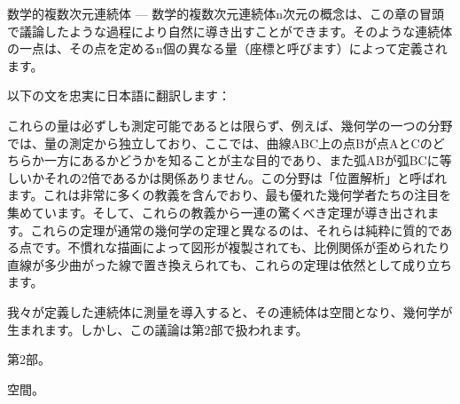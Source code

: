 \documentclass[a4paper,11pt,openany]{ltjsbook}
\begin{document}
数学的複数次元連続体 — 数学的複数次元連続体n次元の概念は、この章の冒頭で議論したような過程により自然に導き出すことができます。そのような連続体の一点は、その点を定めるn個の異なる量（座標と呼びます）によって定義されます。

以下の文を忠実に日本語に翻訳します：

これらの量は必ずしも測定可能であるとは限らず、例えば、幾何学の一つの分野では、量の測定から独立しており、ここでは、曲線ABC上の点Bが点AとCのどちらか一方にあるかどうかを知ることが主な目的であり、また弧ABが弧BCに等しいかそれの2倍であるかは関係ありません。この分野は「位置解析」と呼ばれます。これは非常に多くの教義を含んでおり、最も優れた幾何学者たちの注目を集めています。そして、これらの教義から一連の驚くべき定理が導き出されます。これらの定理が通常の幾何学の定理と異なるのは、それらは純粋に質的である点です。不慣れな描画によって図形が複製されても、比例関係が歪められたり直線が多少曲がった線で置き換えられても、これらの定理は依然として成り立ちます。

我々が定義した連続体に測量を導入すると、その連続体は空間となり、幾何学が生まれます。しかし、この議論は第2部で扱われます。

第2部。

空間。
\end{document}
